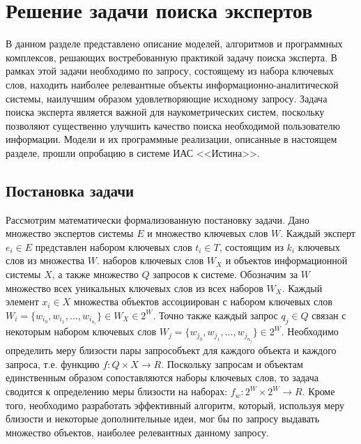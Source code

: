 \section{Решение задачи поиска экспертов} \label{expert_search}

В данном разделе представлено описание моделей, алгоритмов и программных комплексов, решающих востребованную практикой задачу поиска эксперта. В рамках этой задачи необходимо по запросу, состоящему из набора ключевых слов, находить наиболее релевантные объекты информационно-аналитической системы, наилучшим образом удовлетворяющие исходному запросу. Задача поиска эксперта является важной для наукометрических систем, поскольку позволяют существенно улучшить качество поиска необходимой пользователю информации. Модели и их программные реализации, описанные в настоящем разделе, прошли опробацию в системе ИАС <<Истина>>.

\subsection{Постановка задачи}
Рассмотрим математически формализованную постановку задачи. Дано множество экспертов системы $E$ и множество ключевых слов $W$. Каждый эксперт $e_i \in E$ представлен набором ключевых слов $t_i \in T$, состоящим из $k_i$ ключевых слов из множества $W$. наборов ключевых слов $W_X$ и объектов информационной системы $X$, а также множество $Q$ запросов к системе. Обозначим за $W$ множество всех уникальных ключевых слов из всех наборов $W_X$. Каждый элемент $x_i \in X$ множества объектов ассоциирован с набором ключевых слов $W_i = \{w_{i_0}, w_{i_1}, ..., w_{i_{n_i}} \} \in W_X \in 2^W$. Точно также каждый запрос $q_j \in Q$ связан с некоторым набором ключевых слов $W_j = \{w_{j_0}, w_{j_1}, ..., w_{j_{n_j}} \} \in 2^W$. Необходимо определить меру близости пары запрос­объект для каждого объекта и каждого запроса, т.е.  функцию $f : Q \times X \rightarrow R$. Поскольку запросам и объектам единственным образом сопоставляются наборы ключевых слов, то задача сводится к определению меры близости на наборах: $f_w : 2^W \times 2^W \rightarrow R$. Кроме того, необходимо разработать эффективный алгоритм, который, используя меру близости и некоторые дополнительные идеи, мог бы по запросу выдавать множество объектов, наиболее релевантных данному запросу.

